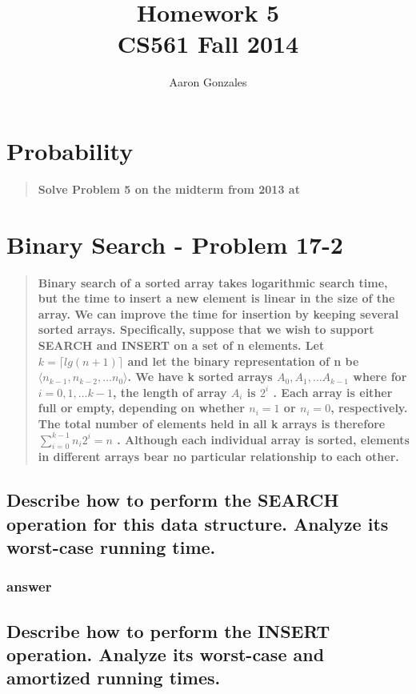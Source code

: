 \documentclass[titlepage]{article}\usepackage[]{graphicx}\usepackage[]{color}
\begin{document}
\title{Homework 5 \\ CS561 Fall 2014}
\author{Aaron Gonzales}
\maketitle


\section{Probability}
\begin{quote}
  \textbf{ Solve Problem 5 on the midterm from 2013 at}
\end{quote}



\section{Binary Search - Problem 17-2}
\begin{quote}
  \textbf{
	Binary search of a sorted array takes logarithmic search time, but the time
	to insert a new element is linear in the size of the array. We can improve
	the time for insertion by keeping several sorted arrays.  Specifically,
	suppose that we wish to support SEARCH and INSERT on a set of n elements.
	Let $k =  \lceil lg(n+1)\rceil $ and let the binary representation of n be
	$ \langle n_{ k-1 }, n_{k-2},\dots n_0 \rangle$.  We have k sorted arrays $
	A_0, A_1, \dots A_{k-1}$ where for $ i = 0, 1, \dots k-1$, the length of
	array $A_i$  is $2^i$ .  Each array is either full or empty, depending on
	whether $n_i = 1 $ or $n_i = 0$, respectively. The total number of elements
	held in all k arrays is therefore $\sum_{i = 0}^{k -1 } n_i 2^i = n $ .
	Although each individual array is sorted, elements in different arrays bear
	no particular relationship to each other.}
\end{quote}


  \subsection{Describe how to perform the SEARCH operation for this data structure.
	Analyze its worst-case running time.}
	\subsubsection{answer}




	\subsection{Describe how to perform the INSERT operation. Analyze its
	worst-case and amortized running times.  }
\end{document}
